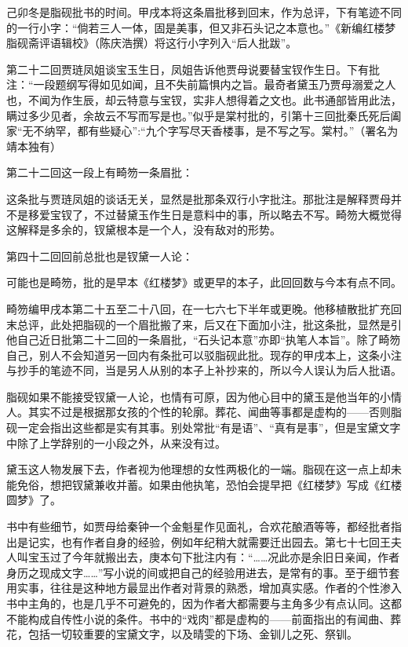 \par 己卯冬是脂砚批书的时间。甲戌本将这条眉批移到回末，作为总评，下有笔迹不同的一行小字：“倘若三人一体，固是美事，但又非石头记之本意也。”《新编红楼梦脂砚斋评语辑校》（陈庆浩撰）将这行小字列入“后人批跋”。
\par 第二十二回贾琏凤姐谈宝玉生日，凤姐告诉他贾母说要替宝钗作生日。下有批注：“一段题纲写得如见如闻，且不失前篇惧内之旨。最奇者黛玉乃贾母溺爱之人也，不闻为作生辰，却云特意与宝钗，实非人想得着之文也。此书通部皆用此法，瞒过多少见者，余故云不写而写是也。”似乎是棠村批的，引第十三回批秦氏死后阖家“无不纳罕，都有些疑心”:“九个字写尽天香楼事，是不写之写。棠村。”（署名为靖本独有）
\par 第二十二回这一段上有畸笏一条眉批：
\par 这条批与贾琏凤姐的谈话无关，显然是批那条双行小字批注。那批注是解释贾母并不是移爱宝钗了，不过替黛玉作生日是意料中的事，所以略去不写。畸笏大概觉得这解释是多余的，钗黛根本是一个人，没有敌对的形势。
\par 第四十二回回前总批也是钗黛一人论：
\par 可能也是畸笏，批的是早本《红楼梦》或更早的本子，此回回数与今本有点不同。
\par 畸笏编甲戌本第二十五至二十八回，在一七六七下半年或更晚。他移植散批扩充回末总评，此处把脂砚的一个眉批搬了来，后又在下面加小注，批这条批，显然是引他自己近日批第二十二回的一条眉批，“石头记本意”亦即“执笔人本旨”。除了畸笏自己，别人不会知道另一回内有条批可以驳脂砚此批。现存的甲戌本上，这条小注与抄手的笔迹不同，当是另人从别的本子上补抄来的，所以今人误认为后人批语。
\par 脂砚如果不能接受钗黛一人论，也情有可原，因为他心目中的黛玉是他当年的小情人。其实不过是根据那女孩的个性的轮廓。葬花、闻曲等事都是虚构的——否则脂砚一定会指出这些都是实有其事。别处常批“有是语”、“真有是事”，但是宝黛文字中除了上学辞别的一小段之外，从来没有过。
\par 黛玉这人物发展下去，作者视为他理想的女性两极化的一端。脂砚在这一点上却未能免俗，想把钗黛兼收并蓄。如果由他执笔，恐怕会提早把《红楼梦》写成《红楼圆梦》了。
\par 书中有些细节，如贾母给秦钟一个金魁星作见面礼，合欢花酿酒等等，都经批者指出是记实，也有作者自身的经验，例如年纪稍大就需要迁出园去。第七十七回王夫人叫宝玉过了今年就搬出去，庚本句下批注内有：“……况此亦是余旧日亲闻，作者身历之现成文字……”写小说的间或把自己的经验用进去，是常有的事。至于细节套用实事，往往是这种地方最显出作者对背景的熟悉，增加真实感。作者的个性渗入书中主角的，也是几乎不可避免的，因为作者大都需要与主角多少有点认同。这都不能构成自传性小说的条件。书中的“戏肉”都是虚构的——前面指出的有闻曲、葬花，包括一切较重要的宝黛文字，以及晴雯的下场、金钏儿之死、祭钏。
